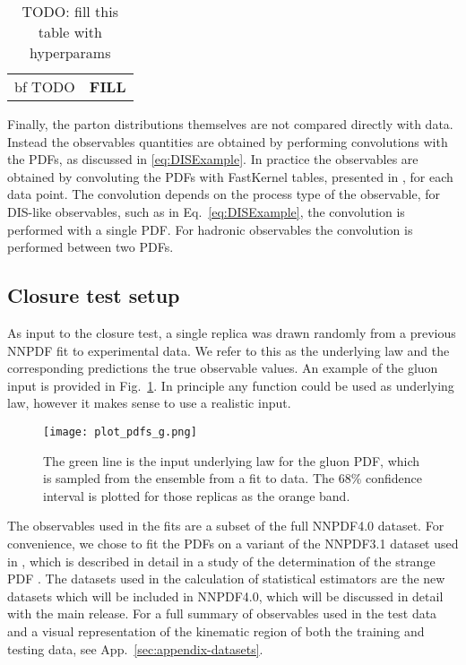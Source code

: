 \begin{table}
    \begin{tabular}[h]{c|c}
        {\rm bf TODO} & {\bf FILL}
    \end{tabular}
    \caption{TODO: fill this table with hyperparams}
    \label{tab:Hyperparams}
\end{table}

Finally, the parton distributions themselves are not compared directly with data.
Instead the observables quantities are obtained by performing convolutions with
the PDFs, as discussed in \ref{eq:DISExample}. In practice the observables are
obtained by convoluting the PDFs with FastKernel tables, presented in
\cite{Ball_2010,Bertone_2017}, for each data point. The convolution depends
on the process type of the observable, for DIS-like observables, such as in
Eq.~\ref{eq:DISExample}, the convolution is performed with a single PDF. For
hadronic observables the convolution is performed between two PDFs.

\subsection{Closure test setup}

As input to the closure test, a single replica was drawn randomly from
a previous NNPDF fit to experimental data. We refer to this as the underlying
law and the corresponding predictions the true observable values. An example
of the gluon input is provided in Fig.~\ref{fig:InputGluonPDF}. In principle
any function could be used as underlying law, however it makes sense to
use a realistic input.

\begin{figure}
    \centering
    \texttt{[image: plot\_pdfs\_g.png]}
    \caption{The green line is the input underlying law for the gluon PDF,
    which is sampled from the ensemble from a fit to data. The 68\% confidence
    interval is plotted for those replicas as the orange band.}
    \label{fig:InputGluonPDF}
\end{figure}

The observables used in the fits are a subset of the full NNPDF4.0 dataset.
For convenience,
we chose to fit the PDFs on a variant of the NNPDF3.1 dataset used in
\cite{Ball_2018}, which is described in detail in a study of the determination
of the strange PDF \cite{Faura_2020}. The datasets used in the calculation of
statistical estimators are the new datasets which will be included in NNPDF4.0,
which will be discussed in detail with the main release. For a full summary of
observables used in the test data and a visual representation of the kinematic
region of both the training and testing data, see App.~\ref{sec:appendix-datasets}.

